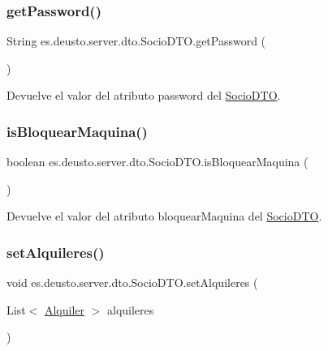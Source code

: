 \subsubsection{\texorpdfstring{getPassword()}{getPassword()}}
{\footnotesize\ttfamily String es.\+deusto.\+server.\+dto.\+Socio\+D\+T\+O.\+get\+Password (\begin{DoxyParamCaption}{ }\end{DoxyParamCaption})}

Devuelve el valor del atributo password del \mbox{\hyperlink{classes_1_1deusto_1_1server_1_1dto_1_1_socio_d_t_o}{Socio\+D\+TO}}. \mbox{\label{classes_1_1deusto_1_1server_1_1dto_1_1_socio_d_t_o_a5e1acb06533d9c944e0e30c8f6b846fe}} 
\subsubsection{\texorpdfstring{isBloquearMaquina()}{isBloquearMaquina()}}
{\footnotesize\ttfamily boolean es.\+deusto.\+server.\+dto.\+Socio\+D\+T\+O.\+is\+Bloquear\+Maquina (\begin{DoxyParamCaption}{ }\end{DoxyParamCaption})}

Devuelve el valor del atributo bloquear\+Maquina del \mbox{\hyperlink{classes_1_1deusto_1_1server_1_1dto_1_1_socio_d_t_o}{Socio\+D\+TO}}. \mbox{\label{classes_1_1deusto_1_1server_1_1dto_1_1_socio_d_t_o_a8b67bdd58091905e9ad7c759f7904320}} 
\subsubsection{\texorpdfstring{setAlquileres()}{setAlquileres()}}
{\footnotesize\ttfamily void es.\+deusto.\+server.\+dto.\+Socio\+D\+T\+O.\+set\+Alquileres (\begin{DoxyParamCaption}\item[{List$<$ \mbox{\hyperlink{classes_1_1deusto_1_1client_1_1data_1_1_alquiler}{Alquiler}} $>$}]{alquileres }\end{DoxyParamCaption})}

